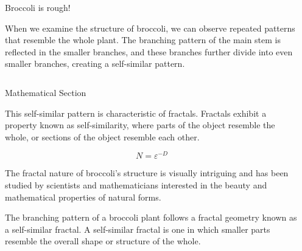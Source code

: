 \documentclass[]{beamer}
\begin{document}
\begin{frame}[t]
\begin{columns}[t]
\begin{column}{\twocolwid}
    \begin{alertblock}{Broccoli is rough!}
    
     When we examine the structure of broccoli, we can observe repeated patterns that resemble the whole plant. The branching pattern of the main stem is reflected in the smaller branches, and these branches further divide into even smaller branches, creating a self-similar pattern.
    
    \end{alertblock} 
    
    
    \begin{columns}[t,totalwidth=\twocolwid] %
    
    \begin{column}{\onecolwid} %
    
    
    \begin{block}{Mathematical Section}
    
    This self-similar pattern is characteristic of fractals. Fractals exhibit a property known as self-similarity, where parts of the object resemble the whole, or sections of the object resemble each other. 
    
    $$
    N = \varepsilon^{-D}
    $$
    
    The fractal nature of broccoli's structure is visually intriguing and has been studied by scientists and mathematicians interested in the beauty and mathematical properties of natural forms. 
    
    The branching pattern of a broccoli plant follows a fractal geometry known as a self-similar fractal. A self-similar fractal is one in which smaller parts resemble the overall shape or structure of the whole.  
    \end{block}
   
    
    
    \end{column} %
    
    \begin{column}{\onecolwid} %
    

\end{column}
\end{columns}
\end{column}
\end{columns}
\end{frame}
\end{document}

